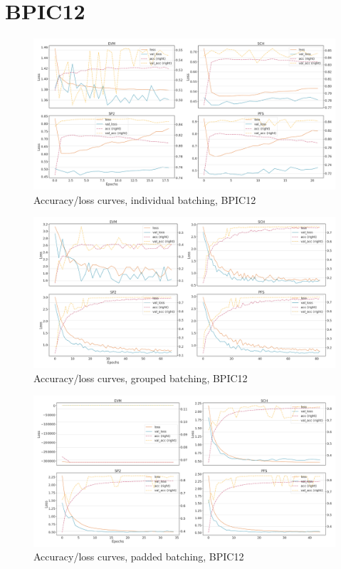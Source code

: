 \section*{BPIC12}
\begin{figure}[!htb]
    \centering
    \includegraphics[width=\textwidth]{gfx/bpic2012/individual_loss_acc_curve.png}
    \caption{Accuracy/loss curves, individual batching, BPIC12}
\end{figure}
\begin{figure}[!htb]
    \centering
    \includegraphics[width=\textwidth]{gfx/bpic2012/grouped_loss_acc_curve.png}
    \caption{Accuracy/loss curves, grouped batching, BPIC12}
\end{figure}
\begin{figure}[!htb]
    \centering
    \includegraphics[width=\textwidth]{gfx/bpic2012/padded_loss_acc_curve.png}
    \caption{Accuracy/loss curves, padded batching, BPIC12}
\end{figure}
